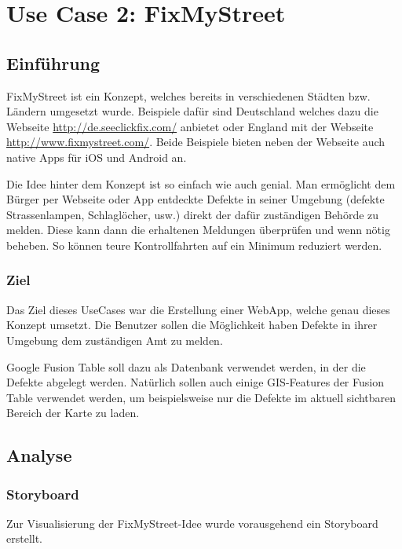 \chapter{Use Case 2: FixMyStreet}

\section{Einführung}
FixMyStreet ist ein Konzept, welches bereits in verschiedenen Städten bzw. Ländern umgesetzt wurde. Beispiele dafür sind Deutschland welches dazu die Webseite  \url{http://de.seeclickfix.com/} anbietet oder England mit der Webseite \url{http://www.fixmystreet.com/}. Beide Beispiele bieten neben der Webseite auch native Apps für iOS und Android an.

Die Idee hinter dem Konzept ist so einfach wie auch genial. Man ermöglicht dem Bürger per Webseite oder App entdeckte Defekte in seiner Umgebung (defekte Strassenlampen, Schlaglöcher, usw.) direkt der dafür zuständigen Behörde zu melden. Diese kann dann die erhaltenen Meldungen überprüfen und wenn nötig beheben. So können teure Kontrollfahrten auf ein Minimum reduziert werden.

\subsection{Ziel}
Das Ziel dieses UseCases war die Erstellung einer WebApp, welche genau dieses Konzept umsetzt. Die Benutzer sollen die Möglichkeit haben Defekte in ihrer Umgebung dem zuständigen Amt zu melden.

Google Fusion Table soll dazu als Datenbank verwendet werden, in der die Defekte abgelegt werden. Natürlich sollen auch einige GIS-Features der Fusion Table verwendet werden, um beispielsweise nur die Defekte im aktuell sichtbaren Bereich der Karte zu laden.

\section{Analyse}

\subsection{Storyboard}
Zur Visualisierung der FixMyStreet-Idee wurde vorausgehend ein Storyboard erstellt.

